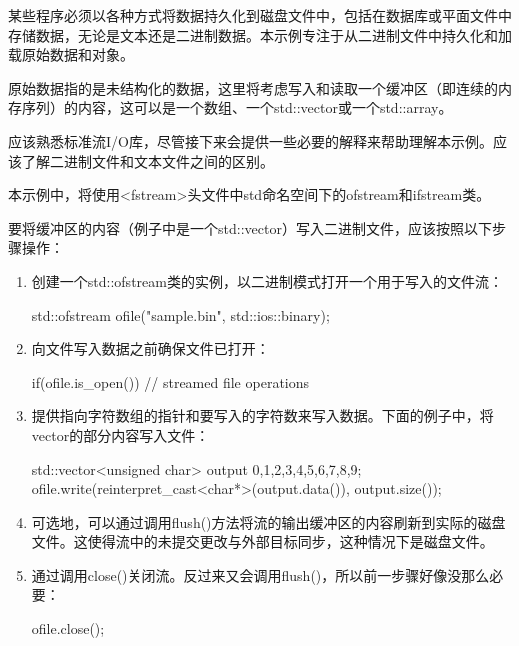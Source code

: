 某些程序必须以各种方式将数据持久化到磁盘文件中，包括在数据库或平面文件中存储数据，无论是文本还是二进制数据。本示例专注于从二进制文件中持久化和加载原始数据和对象。

原始数据指的是未结构化的数据，这里将考虑写入和读取一个缓冲区（即连续的内存序列）的内容，这可以是一个数组、一个std::vector或一个std::array。


应该熟悉标准流I/O库，尽管接下来会提供一些必要的解释来帮助理解本示例。应该了解二进制文件和文本文件之间的区别。

本示例中，将使用<fstream>头文件中std命名空间下的ofstream和ifstream类。


要将缓冲区的内容（例子中是一个std::vector）写入二进制文件，应该按照以下步骤操作：

\begin{enumerate}
\item
创建一个std::ofstream类的实例，以二进制模式打开一个用于写入的文件流：

\begin{cpp}
std::ofstream ofile("sample.bin", std::ios::binary);
\end{cpp}

\item
向文件写入数据之前确保文件已打开：

\begin{cpp}
if(ofile.is_open())
{
    // streamed file operations
}
\end{cpp}

\item
提供指向字符数组的指针和要写入的字符数来写入数据。下面的例子中，将vector的部分内容写入文件：

\begin{cpp}
std::vector<unsigned char> output {0,1,2,3,4,5,6,7,8,9};
ofile.write(reinterpret_cast<char*>(output.data()), output.size());
\end{cpp}

\item
可选地，可以通过调用flush()方法将流的输出缓冲区的内容刷新到实际的磁盘文件。这使得流中的未提交更改与外部目标同步，这种情况下是磁盘文件。

\item
通过调用close()关闭流。反过来又会调用flush()，所以前一步骤好像没那么必要：

\begin{cpp}
ofile.close();
\end{cpp}
\end{enumerate}

